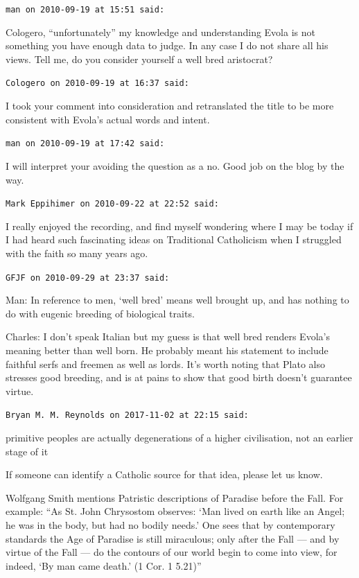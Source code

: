 \begin{footnotesize}
\begin{sffamily}
\hfill

\texttt{man on 2010-09-19 at 15:51 said:}

Cologero, ``unfortunately'' my knowledge and understanding Evola is not something you have enough data to judge. In any case I do not share all his views. Tell me, do you consider yourself a well bred aristocrat?

\hfill

\texttt{Cologero on 2010-09-19 at 16:37 said:}

I took your comment into consideration and retranslated the title to be more consistent with Evola's actual words and intent.

\hfill

\texttt{man on 2010-09-19 at 17:42 said:}

I will interpret your avoiding the question as a no. Good job on the blog by the way.

\hfill

\texttt{Mark Eppihimer on 2010-09-22 at 22:52 said:}

I really enjoyed the recording, and find myself wondering where I may be today if I had heard such fascinating ideas on Traditional Catholicism when I struggled with the faith so many years ago.

\hfill

\texttt{GFJF on 2010-09-29 at 23:37 said:}

Man: In reference to men, `well bred' means well brought up, and has nothing to do with eugenic breeding of biological traits.

Charles: I don't speak Italian but my guess is that well bred renders Evola's meaning better than well born. He probably meant his statement to include faithful serfs and freemen as well as lords. It's worth noting that Plato also stresses good breeding, and is at pains to show that good birth doesn't guarantee virtue.

\hfill

\texttt{Bryan M. M. Reynolds on 2017-11-02 at 22:15 said:}

primitive peoples are actually degenerations of a higher civilisation, not an earlier stage of it

If someone can identify a Catholic source for that idea, please let us know.

Wolfgang Smith mentions Patristic descriptions of Paradise before the Fall. For example: ``As St. John Chrysostom observes: `Man lived on earth like an Angel; he was in the body, but had no bodily needs.' One sees that by contemporary standards the Age of Paradise is still miraculous; only after the Fall --- and by virtue of the Fall --- do the contours of our world begin to come into view, for indeed, `By man came death.' (1 Cor. 1 5.21)''


\end{sffamily}
\end{footnotesize}
